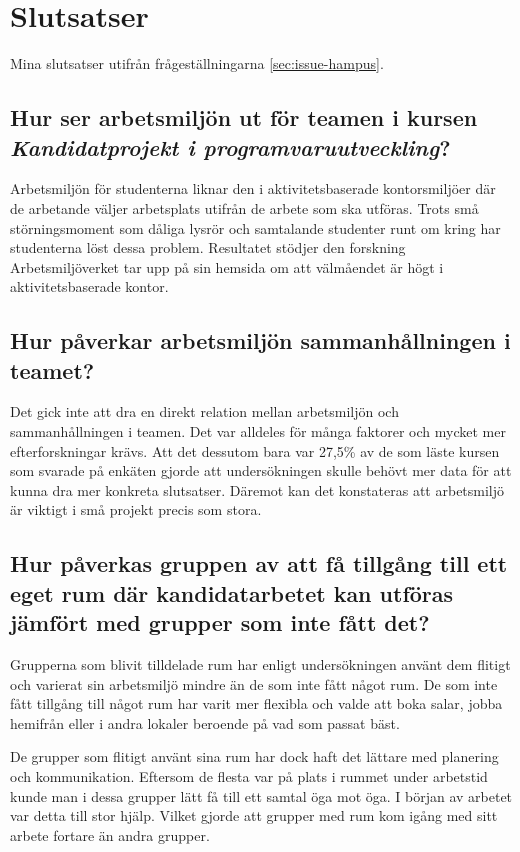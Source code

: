 \section{Slutsatser}
\label{sec:conclusions-hampus}

Mina slutsatser utifrån frågeställningarna \ref{sec:issue-hampus}.

\subsection{Hur ser arbetsmiljön ut för teamen i kursen \textit{Kandidatprojekt i programvaruutveckling}?}
Arbetsmiljön för studenterna liknar den i aktivitetsbaserade kontorsmiljöer där de arbetande väljer arbetsplats utifrån de arbete som ska utföras. Trots små störningsmoment som dåliga lysrör och samtalande studenter runt om kring har studenterna löst dessa problem. Resultatet stödjer den forskning Arbetsmiljöverket tar upp på sin hemsida om att välmåendet är högt i aktivitetsbaserade kontor.  

\subsection{Hur påverkar arbetsmiljön sammanhållningen i teamet?}
Det gick inte att dra en direkt relation mellan arbetsmiljön och sammanhållningen i teamen. Det var alldeles för många faktorer och mycket mer efterforskningar krävs. Att det dessutom bara var 27,5\% av de som läste kursen som svarade på enkäten gjorde att undersökningen skulle behövt mer data för att kunna dra mer konkreta slutsatser. Däremot kan det konstateras att arbetsmiljö är viktigt i små projekt precis som stora. 

\subsection{Hur påverkas gruppen av att få tillgång till ett eget rum där kandidatarbetet kan utföras jämfört med grupper som inte fått det?}
Grupperna som blivit tilldelade rum har enligt undersökningen använt dem flitigt och varierat sin arbetsmiljö mindre än de som inte fått något rum. De som inte fått tillgång till något rum har varit mer flexibla och valde att boka salar, jobba hemifrån eller i andra lokaler beroende på vad som passat bäst. 

De grupper som flitigt använt sina rum har dock haft det lättare med planering och kommunikation. Eftersom de flesta var på plats i rummet under arbetstid kunde man i dessa grupper lätt få till ett samtal öga mot öga. I början av arbetet var detta till stor hjälp. Vilket gjorde att grupper med rum kom igång med sitt arbete fortare än andra grupper.


